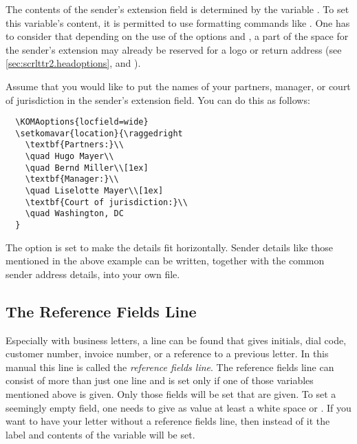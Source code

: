 \begin{Declaration}
\end{Declaration}
%
The contents of the sender's extension field is determined by the
variable . To set this variable's content, it is
permitted to use formatting commands like . One has
to consider that depending on the use of the options
 and , a part of the space for the
sender's extension may already be reserved for a logo or return
address (see \autoref{sec:scrlttr2.headoptions},
 and
).
%
\begin{Example}
  Assume that you would like to put the names of your partners,
  manager, or court of jurisdiction in the sender's extension
  field. You can do this as follows:
\begin{lstlisting}
  \KOMAoptions{locfield=wide}
  \setkomavar{location}{\raggedright
    \textbf{Partners:}\\
    \quad Hugo Mayer\\
    \quad Bernd Miller\\[1ex]
    \textbf{Manager:}\\
    \quad Liselotte Mayer\\[1ex]
    \textbf{Court of jurisdiction:}\\
    \quad Washington, DC
  }
\end{lstlisting}
The option  is set to make the details fit
horizontally. Sender details like those mentioned in the above example
can be written, together with the common sender address details, into
your own  file.
\end{Example}
%
%
%


\subsection{The Reference Fields Line}
\label{sec:scrlttr2.refLine}
%

Especially with business letters, a line can be found that gives
initials, dial code, customer number, invoice number, or a reference
to a previous letter.  In this manual this line is called the
\emph{reference fields line}. The reference fields line can consist of
more than just one line and is set only if one of those variables
mentioned above is given. Only those fields will be set that are
given. To set a seemingly empty field, one needs to give as value at
least a white space or . If you want to have your letter
without a reference fields line, then instead of it the label and
contents of the variable  will be set.



